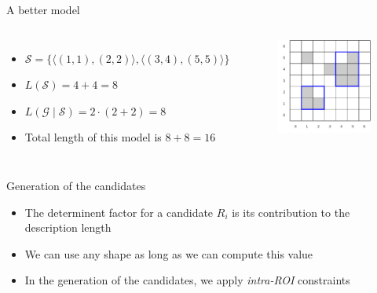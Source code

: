 \documentclass[10pt]{beamer}
\begin{document}
\begin{frame}{A better model}

    \begin{columns}[T, onlytextwidth]
            \begin{itemize}
                \item $\mathcal{S} = \{ \langle (1,1),(2, 2) \rangle, \langle(3, 4),(5,5)\rangle\}$
                \item $L(\mathcal{S}) = 4 + 4 = 8$
                \item $L(\mathcal{G} \mid \mathcal{S}) = 2\cdot (2 + 2) = 8$
                \item Total length of this model is $8 + 8 = 16$
            \end{itemize}

        \begin{figure}
            \centering
            \includegraphics[scale=0.5]{figures/running-example/MDL/example-2.pdf}
        \end{figure}
    \end{columns}

\end{frame}

\begin{frame}{Generation of the candidates}
    \begin{itemize}
        \item The determinent factor for a candidate $R_i$ is its contribution to the description length
        \item We can use any shape as long as we can compute this value
        \item In the generation of the candidates, we apply \emph{intra-ROI} constraints
    \end{itemize}
\end{frame}
\end{document}

